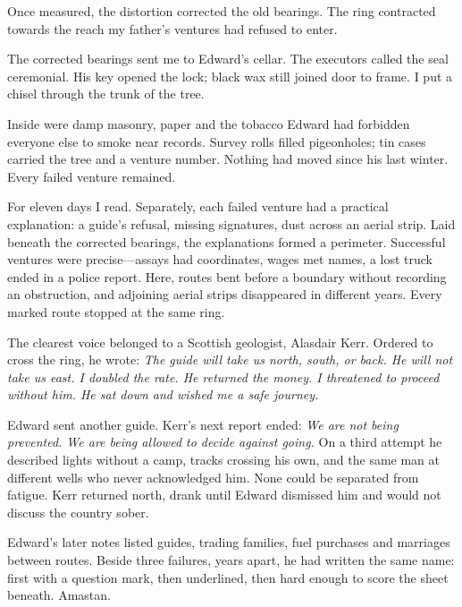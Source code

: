 Once measured, the distortion corrected the old bearings. The ring contracted towards the reach my father's ventures had refused to enter.\par

The corrected bearings sent me to Edward's cellar. The executors called the seal ceremonial. His key opened the lock; black wax still joined door to frame. I put a chisel through the trunk of the tree.\par

Inside were damp masonry, paper and the tobacco Edward had forbidden everyone else to smoke near records. Survey rolls filled pigeonholes; tin cases carried the tree and a venture number. Nothing had moved since his last winter. Every failed venture remained.\par

For eleven days I read. Separately, each failed venture had a practical explanation: a guide's refusal, missing signatures, dust across an aerial strip. Laid beneath the corrected bearings, the explanations formed a perimeter. Successful ventures were precise—assays had coordinates, wages met names, a lost truck ended in a police report. Here, routes bent before a boundary without recording an obstruction, and adjoining aerial strips disappeared in different years. Every marked route stopped at the same ring.\par

The clearest voice belonged to a Scottish geologist, Alasdair Kerr. Ordered to cross the ring, he wrote: \emph{The guide will take us north, south, or back. He will not take us east. I doubled the rate. He returned the money. I threatened to proceed without him. He sat down and wished me a safe journey.}\par

Edward sent another guide. Kerr's next report ended: \emph{We are not being prevented. We are being allowed to decide against going.} On a third attempt he described lights without a camp, tracks crossing his own, and the same man at different wells who never acknowledged him. None could be separated from fatigue. Kerr returned north, drank until Edward dismissed him and would not discuss the country sober.\par

Edward's later notes listed guides, trading families, fuel purchases and marriages between routes. Beside three failures, years apart, he had written the same name: first with a question mark, then underlined, then hard enough to score the sheet beneath. Amastan.\par

